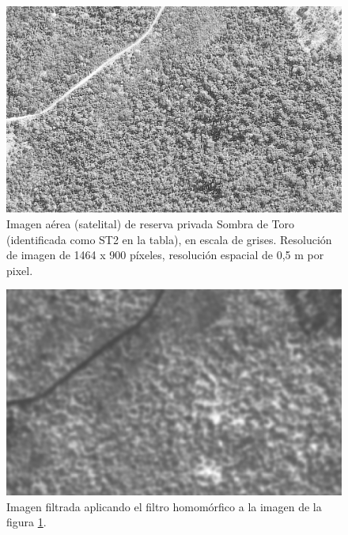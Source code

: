 

\begin{figure}[h!]
    \includegraphics[width=\textwidth]{Imagenes/Homomorfico/ST2.png}
     \hfill
     \caption{Imagen aérea (satelital) de reserva privada Sombra de Toro (identificada como ST2 en la tabla), en escala de grises. Resolución de imagen de 1464 x 900 píxeles, resolución espacial de 0,5 m por pixel.}
    \label{sombratorogris}
\end{figure}

\begin{figure}[h!]
    \includegraphics[width=\textwidth]{Imagenes/Homomorfico/ST2_filtro.png}
     \hfill
     \caption{Imagen filtrada aplicando el filtro homomórfico a la imagen de la figura \ref{sombratorogris}.}
    \label{ST filtro}
\end{figure}

